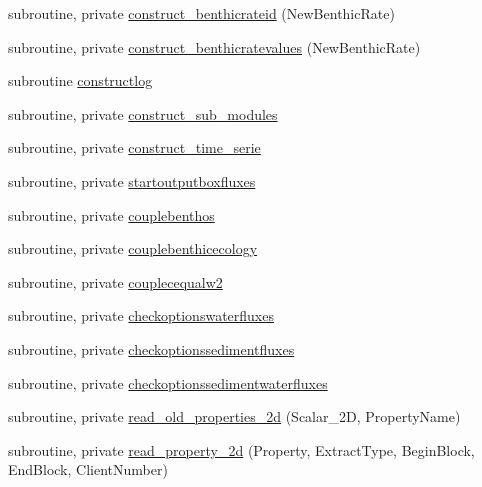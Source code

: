 \begin{DoxyCompactItemize}
\item 
subroutine, private \mbox{\hyperlink{namespacemoduleinterfacesedimentwater_a079a9bc42bec35aabbd6e236c075228e}{construct\+\_\+benthicrateid}} (New\+Benthic\+Rate)
\item 
subroutine, private \mbox{\hyperlink{namespacemoduleinterfacesedimentwater_a6172f96194c964b013cd855127df7b8d}{construct\+\_\+benthicratevalues}} (New\+Benthic\+Rate)
\item 
subroutine \mbox{\hyperlink{namespacemoduleinterfacesedimentwater_a77697f9640e26157a55381bdf7158131}{constructlog}}
\item 
subroutine, private \mbox{\hyperlink{namespacemoduleinterfacesedimentwater_a95c6fc880171b2c2d476ac8adcb366e0}{construct\+\_\+sub\+\_\+modules}}
\item 
subroutine, private \mbox{\hyperlink{namespacemoduleinterfacesedimentwater_ad93a2c6131aefc16d45e6f81ca87678e}{construct\+\_\+time\+\_\+serie}}
\item 
subroutine, private \mbox{\hyperlink{namespacemoduleinterfacesedimentwater_af7fed6c8828bf29ad2aadce486e94d62}{startoutputboxfluxes}}
\item 
subroutine, private \mbox{\hyperlink{namespacemoduleinterfacesedimentwater_a0c508a9cfd619780e5dee7d75830b71a}{couplebenthos}}
\item 
subroutine, private \mbox{\hyperlink{namespacemoduleinterfacesedimentwater_a3f246d5d6de3e05347807acd5b8422a1}{couplebenthicecology}}
\item 
subroutine, private \mbox{\hyperlink{namespacemoduleinterfacesedimentwater_a853cbc670535f28311263abc42873874}{couplecequalw2}}
\item 
subroutine, private \mbox{\hyperlink{namespacemoduleinterfacesedimentwater_a3d7dba6457e9607bdd56867fc1e7516c}{checkoptionswaterfluxes}}
\item 
subroutine, private \mbox{\hyperlink{namespacemoduleinterfacesedimentwater_af1236045d4bf3e91947d80c8c3140745}{checkoptionssedimentfluxes}}
\item 
subroutine, private \mbox{\hyperlink{namespacemoduleinterfacesedimentwater_a4e30b1a0b5e1d1437a7a7f27bc7aea53}{checkoptionssedimentwaterfluxes}}
\item 
subroutine, private \mbox{\hyperlink{namespacemoduleinterfacesedimentwater_ae36783dede749530b40ad98b22316f39}{read\+\_\+old\+\_\+properties\+\_\+2d}} (Scalar\+\_\+2D, Property\+Name)
\item 
subroutine, private \mbox{\hyperlink{namespacemoduleinterfacesedimentwater_a8cfac9807ceccbcd4aa2d115757fe179}{read\+\_\+property\+\_\+2d}} (Property, Extract\+Type, Begin\+Block, End\+Block, Client\+Number)

\end{DoxyCompactItemize}
